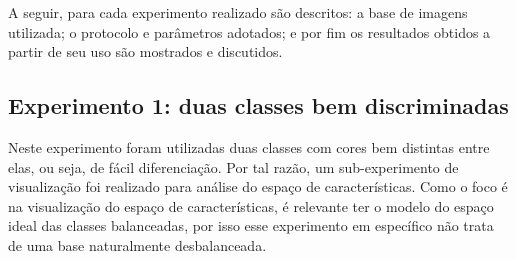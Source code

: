 A seguir, para cada experimento realizado são descritos: a base de imagens utilizada; o protocolo e parâmetros adotados; e por fim os resultados obtidos a partir de seu uso são mostrados e discutidos.

\FloatBarrier
\subsection{Experimento 1: duas classes bem discriminadas}

Neste experimento foram utilizadas duas classes com cores bem distintas entre elas, ou seja, de fácil diferenciação. Por tal razão, um sub-experimento de visualização foi realizado para análise do espaço de características. Como o foco é na visualização do espaço de características, é relevante ter o modelo do espaço ideal das classes balanceadas, por isso esse experimento em específico não trata de uma base naturalmente desbalanceada.

